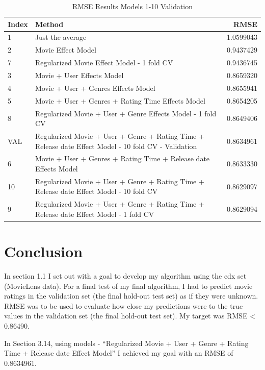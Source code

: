 \documentclass[
]{article}
\begin{document}
\begin{table}[H]

\caption{\label{tab:final_val_3}RMSE Results Models 1-10 Validation\label{tbl:rmse_results_model_1-10_val}}
\centering
\fontsize{7}{9}\selectfont
\begin{tabular}[t]{llr}
\toprule
Index & Method & RMSE\\
\midrule
1 & Just the average & 1.0599043\\
2 & Movie Effect Model & 0.9437429\\
7 & Regularized Movie Effect Model - 1 fold CV & 0.9436745\\
3 & Movie + User Effects Model & 0.8659320\\
4 & Movie + User + Genres Effects Model & 0.8655941\\
5 & Movie + User + Genres + Rating Time Effects Model & 0.8654205\\
8 & Regularized Movie + User + Genre Effects Model - 1 fold CV & 0.8649406\\
VAL & Regularized Movie + User + Genre + Rating Time + Release date Effect Model - 10 fold CV - Validation & 0.8634961\\
6 & Movie + User + Genres + Rating Time + Release date Effects Model & 0.8633330\\
10 & Regularized Movie + User + Genre + Rating Time + Release date Effect Model - 10 fold CV & 0.8629097\\
9 & Regularized Movie + User + Genre + Rating Time + Release date Effect Model - 1 fold CV & 0.8629094\\
\bottomrule
\end{tabular}
\end{table}

\newpage

\hypertarget{conclusion}{%
\section{Conclusion}\label{conclusion}}

In section 1.1 I set out with a goal to develop my algorithm using the
edx set (MovieLens data). For a final test of my final algorithm, I had
to predict movie ratings in the validation set (the final hold-out test
set) as if they were unknown. RMSE was to be used to evaluate how close
my predictions were to the true values in the validation set (the final
hold-out test set). My target was RMSE \textless{} 0.86490.

In Section 3.14, using models - ``Regularized Movie + User + Genre +
Rating Time + Release date Effect Model'' I achieved my goal with an
RMSE of 0.8634961.
\end{document}
